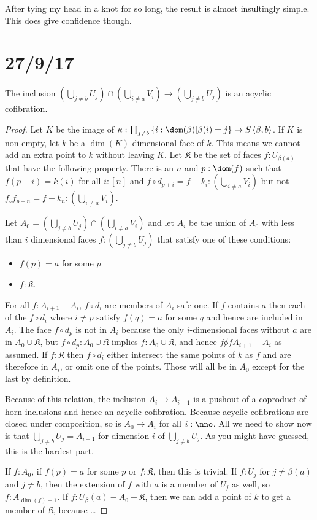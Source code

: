 \documentclass{tac}
\newcommand\set[1]{\left\{#1\right\}}
\newcommand\of{:}
\newcommand\tuplet[1]{\left\langle #1 \right\rangle}
\begin{document}
After tying my head in a knot for so long, the result is almost insultingly simple. This does give confidence though.

\section{27/9/17}

\begin{proposition} The inclusion $(\bigcup_{j\neq b} U_j) \cap (\bigcup_{i\neq a} V_i)\to (\bigcup_{j\neq b} U_j) $ is an acyclic cofibration.
\end{proposition}

\begin{proof}
Let $K$ be the image of $\kappa\of \prod_{j\neq b}\set{i\of\dom(\beta)|\beta(i)=j} \to S\tuplet{\beta,b}$. If $K$ is non empty, let $k$ be a $\dim(K)$-dimensional face of $k$. This means we cannot add an extra point to $k$ without leaving $K$.
Let $\mathfrak K$ be the set of faces $f\of U_{\beta(a)}$ that have the following property. There is an $n$ and $p\of \dom(f)$ such that 
$f(p+i) = k(i)$ for all $i\of[n]$ and
$f\circ d_{p+i} = f - k_i \of (\bigcup_{i\neq a} V_i)$ but not $f_\circ f_{p+n} = f - k_n \of (\bigcup_{i\neq a} V_i)$.

Let $A_0 = (\bigcup_{j\neq b} U_j) \cap (\bigcup_{i\neq a} V_i)$ and let $A_{i}$ be the union of $A_0$ with less than $i$ dimensional faces $f\of (\bigcup_{j\neq b} U_j)$ that satisfy one of these conditions:
\begin{itemize}
\item $f(p) = a$ for some $p$
\item $f\of \mathfrak K$.
\end{itemize}

For all $f\of A_{i+1} - A_i$, $f\circ d_i$ are members of $A_i$ safe one. If $f$ contains $a$ then each of the $f\circ d_i$ where $i\neq p$ satisfy $f(q) = a$ for some $q$ and hence are included in $A_i$. The face $f\circ d_p$ is not in $A_i$ because the only $i$-dimensional faces without $a$ are in $A_0\cup\mathfrak K$, but $f\circ d_p \of A_0\cup\mathfrak K$ implies $f\of A_0\cup\mathfrak K$, and hence $f\not of A_{i+1} - A_i$ as assumed.
If $f\of\mathfrak K$ then $f\circ d_i$ either intersect the same points of $k$ as $f$ and are therefore in $A_i$, or omit one of the points. Those will all be in $A_0$ except for the last by definition.

Because of this relation, the inclusion $A_i\to A_{i+1}$ is a pushout of a coproduct of horn inclusions and hence an acyclic cofibration. Because acyclic cofibrations are closed under composition, so is $A_0\to A_i$ for all $i\of \nno$. All we need to show now is that $\bigcup_{j\neq b} U_j = A_{i+1}$ for dimension $i$ of $\bigcup_{j\neq b} U_j$. As you might have guessed, this is the hardest part.

If $f\of A_0$, if $f(p) = a$ for some $p$ or $f\of \mathfrak K$, then this is trivial.
If $f\of U_j$ for $j\neq \beta(a)$ and $j\neq b$, then the extension of $f$ with $a$ is a member of $U_j$ as well, so $f\of A_{\dim(f)+1}$.
If $f\of U_\beta(a) - A_0 - \mathfrak K$, then we can add a point of $k$
 to get a member of $\mathfrak K$, because \dots
\end{proof}
\end{document}
